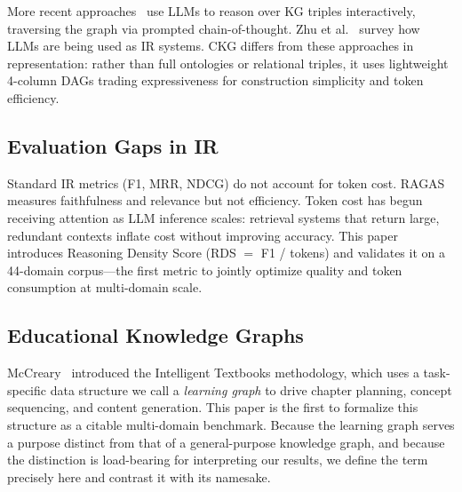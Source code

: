 More recent approaches~\cite{luo2024rag} use LLMs to reason over KG
triples interactively, traversing the graph via prompted chain-of-thought.
Zhu et al.~\cite{zhu2023large} survey how LLMs are being used as IR systems.
CKG differs from these approaches in representation: rather than full
ontologies or relational triples, it uses lightweight 4-column DAGs trading
expressiveness for construction simplicity and token efficiency.

\subsection{Evaluation Gaps in IR}\label{sec:rw-eval}

Standard IR metrics (F1, MRR, NDCG) do not account for token cost.
RAGAS~\cite{es2023ragas} measures faithfulness and relevance but not
efficiency. Token cost has begun receiving attention as LLM inference
scales: retrieval systems that return large, redundant contexts inflate
cost without improving accuracy. This paper introduces Reasoning Density
Score (RDS $=$ F1 / tokens) and validates it on a 44-domain corpus---the
first metric to jointly optimize quality and token consumption at
multi-domain scale.

\subsection{Educational Knowledge Graphs}\label{sec:rw-edu}

McCreary~\cite{mccreary2024textbooks} introduced the Intelligent Textbooks
methodology, which uses a task-specific data structure we call a
\emph{learning graph} to drive chapter planning, concept sequencing, and
content generation. This paper is the first to formalize this structure as
a citable multi-domain benchmark. Because the learning graph serves a
purpose distinct from that of a general-purpose knowledge graph, and
because the distinction is load-bearing for interpreting our results, we
define the term precisely here and contrast it with its namesake.

